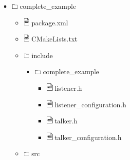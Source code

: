 \begin{itemize}
	\item[] \includegraphics[width=0.3cm]{gfx/tree/folder.png} complete\_example
	\begin{itemize}
	\item[] \includegraphics[width=0.3cm]{gfx/tree/file_xml.png} package.xml
	\item[] \includegraphics[width=0.3cm]{gfx/tree/file_txt.png} CMakeLists.txt
	\item[] \includegraphics[width=0.3cm]{gfx/tree/folder.png} include
	\begin{itemize}
	\item[] \includegraphics[width=0.3cm]{gfx/tree/folder.png} complete\_example
	\begin{itemize}
	\item[] \includegraphics[width=0.3cm]{gfx/tree/file_cpp.png} listener.h
	\item[] \includegraphics[width=0.3cm]{gfx/tree/file_cpp.png} listener\_configuration.h
	\item[] \includegraphics[width=0.3cm]{gfx/tree/file_cpp.png} talker.h
	\item[] \includegraphics[width=0.3cm]{gfx/tree/file_cpp.png} talker\_configuration.h
	\end{itemize}
	\end{itemize}
	\item[] \includegraphics[width=0.3cm]{gfx/tree/folder.png} src

\end{itemize}
\end{itemize}
